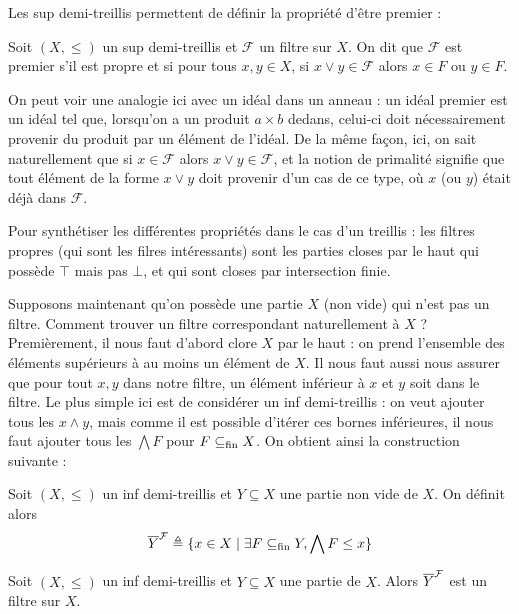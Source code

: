 Les sup demi-treillis permettent de définir la propriété d'être premier :

\begin{definition}
  Soit $(X,\leq)$ un sup demi-treillis et $\mathcal F$ un filtre sur $X$. On dit
  que $\mathcal F$ est premier s'il est propre et si pour tous $x,y\in X$, si
  $x\lor y \in \mathcal F$ alors $x\in F$ ou $y\in F$.
\end{definition}

On peut voir une analogie ici avec un idéal dans un anneau : un idéal premier
est un idéal tel que, lorsqu'on a un produit $a\times b$ dedans, celui-ci doit
nécessairement provenir du produit par un élément de l'idéal. De la même façon,
ici, on sait naturellement que si $x\in\mathcal F$ alors
$x\lor y \in\mathcal F$, et la notion de primalité signifie que tout élément de
la forme $x\lor y$ doit provenir d'un cas de ce type, où $x$ (ou $y$) était déjà
dans $\mathcal F$.

Pour synthétiser les différentes propriétés dans le cas d'un treillis : les
filtres propres (qui sont les filres intéressants) sont les parties closes par
le haut qui possède $\top$ mais pas $\bot$, et qui sont closes par intersection
finie.

Supposons maintenant qu'on possède une partie $X$ (non vide) qui n'est pas un
filtre. Comment trouver un filtre correspondant naturellement à $X$ ?
Premièrement, il nous faut d'abord clore $X$ par le haut : on prend l'ensemble
des éléments supérieurs à au moins un élément de $X$. Il nous faut aussi nous
assurer que pour tout $x,y$ dans notre filtre, un élément inférieur à $x$ et $y$
soit dans le filtre. Le plus simple ici est de considérer un inf demi-treillis :
on veut ajouter tous les $x\land y$, mais comme il est possible d'itérer ces
bornes inférieures, il nous faut ajouter tous les $\bigwedge F$ pour
$F\subseteq_{\mathrm{fin}} X$. On obtient ainsi la construction suivante :

\begin{definition}
  Soit $(X,\leq)$ un inf demi-treillis et $Y\subseteq X$ une partie non vide de
  $X$. On définit alors
  \[\overline{Y}^{\mathcal F} \triangleq \{x\in X \mid \exists F\subseteq_{\mathrm{fin}} Y, \bigwedge F \leq x\}\]
\end{definition}

\begin{proposition}
  Soit $(X,\leq)$ un inf demi-treillis et $Y\subseteq X$ une partie de $X$.
  Alors $\overline{Y}^{\mathcal F}$ est un filtre sur $X$.
\end{proposition}

